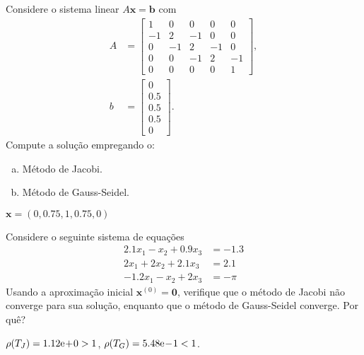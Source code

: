 \begin{exer}
  Considere o sistema linear $A\pmb{x} = \pmb{b}$ com
  \begin{align}
    A &=
        \begin{bmatrix}
          1& 0& 0& 0& 0\\
          -1& 2& -1& 0& 0\\
          0& -1& 2& -1& 0\\
          0& 0& -1& 2& -1\\
          0& 0& 0& 0& 1
        \end{bmatrix},\\
    b &=
        \begin{bmatrix}
          0\\
          0.5\\
          0.5\\
          0.5\\
          0
        \end{bmatrix}.
  \end{align}
  Compute a solução empregando o:
  \begin{enumerate}[a)]
  \item Método de Jacobi.
  \item Método de Gauss-Seidel.
  \end{enumerate}
\end{exer}
\begin{resp}
  $\pmb{x} = (0, 0.75, 1, 0.75, 0)$
\end{resp}

\begin{exer}
  Considere o seguinte sistema de equações
  \begin{equation}
    \begin{aligned}
      2.1x_1 - x_2 + 0.9x_3 &= -1.3\\
      2x_1 + 2x_2 + 2.1x_3 &= 2.1\\
      -1.2x_1 - x_2 + 2x_3 &= -\pi
    \end{aligned}
  \end{equation}
  Usando a aproximação inicial $\pmb{x}^{(0)} = \pmb{0}$, verifique que o método de Jacobi não converge para sua solução, enquanto que o método de Gauss-Seidel converge. Por quê?
\end{exer}
\begin{resp}
  $\rho(T_J) = 1.12\mathrm{e}\!+\!0 > 1$, $\rho(T_G) = 5.48\mathrm{e}\!-\!1 < 1$.
\end{resp}

